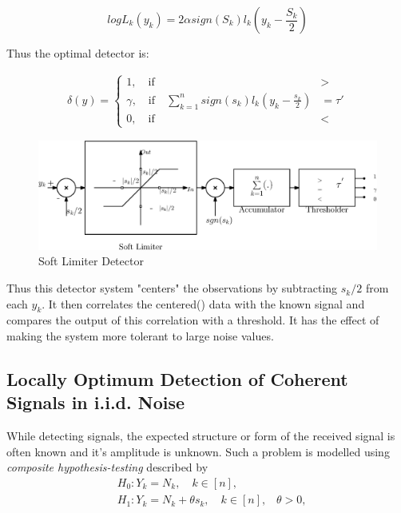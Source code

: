 \documentclass[12pt]{report}
\begin{document}
\begin{exmp}
		\begin{equation}
		log L_k(y_k) = 2 \alpha sign(S_k) l_k(y_k - \frac{S_k}{2})
		\end{equation}
		
		
		Thus the optimal detector is:
		
		\begin{align*}
		\delta(y)=
		\begin{cases}
		1, \quad \text{if} &> \\
		\gamma, \quad \text{if} \quad\sum_{k=1}^{n} sign(s_k) l_k(y_k- \frac{s_k}{2}) &= \tau ' \\
		0, \quad \text{if} &< 
		\end{cases}
		\end{align*}
	
		\begin{figure}[h]
			\centering
			\includegraphics[scale=0.6]{Figures/SoftLimiterDet.eps}
			\caption{Soft Limiter Detector}
			\label{fig:SoftLimiterDet}
		\end{figure}
	\end{exmp}
	
	Thus this detector system "centers" the observations by subtracting $s_k/2$ from each $y_k$. It then correlates the centered() data with the known signal and compares the output of this correlation with a threshold. It has the effect of making the system more tolerant to large noise values.
	
	\subsection
	{Locally Optimum Detection of Coherent Signals in i.i.d. Noise}
	 
	While detecting signals, the expected structure or form  of the received signal is often known and it's amplitude is unknown. Such a problem is modelled using {\em composite hypothesis-testing} described by
	\begin{align*}	
	&H_{0}: Y_{k} = N_{k}, \quad  k \in [n],\\
	&H_{1}: Y_{k} = N_{k}+\theta{s_{k}}, \quad  k \in [n],\hspace{10pt}\theta>0,
	\end{align*}
	
\end{document}
